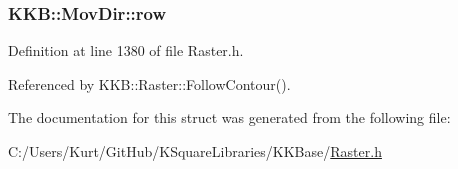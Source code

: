 \subsubsection[{\texorpdfstring{row}{row}}]{ K\+K\+B\+::\+Mov\+Dir\+::row}\hypertarget{struct_k_k_b_1_1_mov_dir_a19c78385b3fbec09dbe624baef003187}{}\label{struct_k_k_b_1_1_mov_dir_a19c78385b3fbec09dbe624baef003187}


Definition at line 1380 of file Raster.\+h.



Referenced by K\+K\+B\+::\+Raster\+::\+Follow\+Contour().



The documentation for this struct was generated from the following file\+:\begin{DoxyCompactItemize}
\item 
C\+:/\+Users/\+Kurt/\+Git\+Hub/\+K\+Square\+Libraries/\+K\+K\+Base/\hyperlink{_raster_8h}{Raster.\+h}\end{DoxyCompactItemize}
